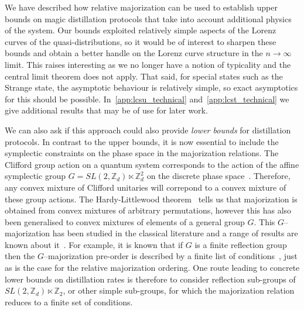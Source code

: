 \documentclass[pra,
aps,
twocolumn,
superscriptaddress,
groupedaddress,
nofootinbib,
reprint
]{revtex4-1}
\begin{document}
We have described how relative majorization can be used to establish upper bounds on magic distillation protocols that take into account additional physics of the system. Our bounds exploited relatively simple aspects of the Lorenz curves of the quasi-distributions, so it would be of interest to sharpen these bounds and obtain a better handle on the Lorenz curve structure in the $n\rightarrow \infty$ limit. This raises interesting  as we no longer have a notion of typicality and the central limit theorem does not apply. That said, for special states such as the Strange state, the asymptotic behaviour is relatively simple, so exact asymptotics for this should be possible. In~\cref{app:lcsu_technical} and~\cref{app:lcst_technical} we give additional results that may be of use for later work.

We can also ask if this approach could also provide \emph{lower bounds} for distillation protocols. In contrast to the upper bounds, it is now essential to include the symplectic constraints on the phase space in the majorization relations. The Clifford group action on a quantum system corresponds to the action of the affine symplectic group $G=SL(2,\mathbb{Z}_d) \ltimes \mathbb{Z}_d^2$ on the discrete phase space~\cite{cit:gross3, cit:bengtsson}. Therefore, any convex mixture of Clifford unitaries will correpond to a convex mixture of these group actions. The Hardy-Littlewood theorem~\cite{hardy_1952} tells us that majorization is obtained from convex mixtures of arbitrary permutations, however this has also been generalised to convex mixtures of elements of a general group $G$. This $G$--majorization has been studied in the classical literature and a range of results are known about it~\cite{giovagnoli_1985, steerneman_1990, eaton_1977}. For example, it is known that if $G$ is a finite reflection group then the $G$--majorization pre-order is described by a finite list of conditions~\cite{giovagnoli_1985}, just as is the case for the relative majorization ordering. One route leading to concrete lower bounds on distillation rates is therefore to consider reflection sub-groups of $SL(2,\mathbb{Z}_d) \ltimes \mathbb{Z}_2$, or other simple sub-groups, for which the majorization relation reduces to a finite set of conditions.
  
\end{document}
